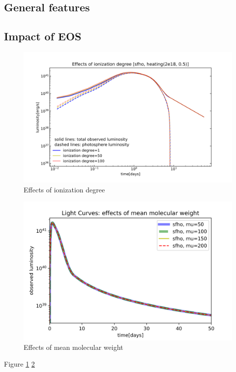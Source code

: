\documentclass[fleqn,usenatbib]{mnras}
\begin{document}
\subsection{General features}
\subsection{Impact of EOS}

\begin{figure}
\centering
\includegraphics[scale=0.5]{figures/EOSimpact/Effects_of_ionization_degree}
\caption{Effects of ionization degree}
\label{EOSimpact_ionization}
\end{figure}

\begin{figure}
\centering
\includegraphics[scale=0.65]{figures/EOSimpact/Light_curves_effects_of_mu}
\caption{Effects of mean molecular weight}
\label{EOSimpact_mu}
\end{figure}
Figure \ref{EOSimpact_ionization} \ref{EOSimpact_mu}
\end{document}
